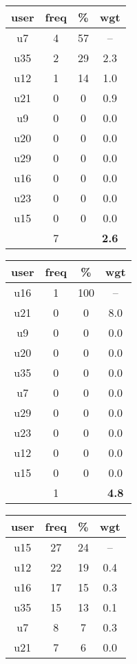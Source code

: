 \begin{appendices}
\begin{table}
\centering
\begin{tabular}{ |c|c|c|c| }
	\hline
	\textbf{user} & \textbf{freq} & \textbf{\%} & \textbf{wgt} \\
	\hline
	u7 & 4 & 57 & -- \\
	u35 & 2 & 29 & 2.3 \\
	u12 & 1 & 14 & 1.0 \\
	u21 & 0 & 0 & 0.9 \\
	u9 & 0 & 0 & 0.0 \\
	u20 & 0 & 0 & 0.0 \\
	u29 & 0 & 0 & 0.0 \\
	u16 & 0 & 0 & 0.0 \\
	u23 & 0 & 0 & 0.0 \\
	u15 & 0 & 0 & 0.0 \\
	 & 7 & & \textbf{2.6} \\
	\hline
\end{tabular}
\begin{tabular}{ |c|c|c|c| }
	\hline
	\textbf{user} & \textbf{freq} & \textbf{\%} & \textbf{wgt} \\
	\hline
	u16 & 1 & 100 & -- \\
	u21 & 0 & 0 & 8.0 \\
	u9 & 0 & 0 & 0.0 \\
	u20 & 0 & 0 & 0.0 \\
	u35 & 0 & 0 & 0.0 \\
	u7 & 0 & 0 & 0.0 \\
	u29 & 0 & 0 & 0.0 \\
	u23 & 0 & 0 & 0.0 \\
	u12 & 0 & 0 & 0.0 \\
	u15 & 0 & 0 & 0.0 \\
	 & 1 & & \textbf{4.8} \\
	\hline
\end{tabular}
\begin{tabular}{ |c|c|c|c| }
	\hline
	\textbf{user} & \textbf{freq} & \textbf{\%} & \textbf{wgt} \\
	\hline
	u15 & 27 & 24 & -- \\
	u12 & 22 & 19 & 0.4 \\
	u16 & 17 & 15 & 0.3 \\
	u35 & 15 & 13 & 0.1 \\
	u7 & 8 & 7 & 0.3 \\
	u21 & 7 & 6 & 0.0 \\

\end{tabular}
\end{table}
\end{appendices}
